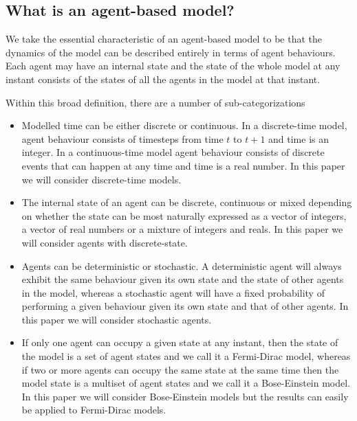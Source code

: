 \documentclass{article}
\begin{document}
\subsection{What is an agent-based model?}

We take the essential characteristic of an agent-based model to be that the dynamics of the model can be described entirely in terms of agent behaviours. Each agent may have an internal state and the state of the whole model at any instant consists of the states of all the agents in the model at that instant.

Within this broad definition, there are a number of sub-categorizations
\begin{itemize}

\item Modelled time can be either discrete or continuous. In a discrete-time model, agent behaviour consists of timesteps from time $t$ to $t+1$ and time is an integer. In a continuous-time model agent behaviour consists of discrete events that can happen at any time and time is a real number. In this paper we will consider discrete-time models.

\item The internal state of an agent can be discrete, continuous or mixed depending on whether the state can be most naturally expressed as a vector of integers, a vector of real numbers or a mixture of integers and reals. In this paper we will consider agents with discrete-state. 

\item Agents can be deterministic or stochastic. A deterministic agent will always exhibit the same behaviour given its own state and the state of other agents in the model, whereas a stochastic agent will have a fixed probability of performing a given behaviour given its own state and that of other agents. In this paper we will consider stochastic agents.

\item If only one agent can occupy a given state at any instant, then the state of the model is a set of agent states and we call it a Fermi-Dirac model, whereas if two or more agents can occupy the same state at the same time then the model state is a multiset\cite{blizard1988multiset} of agent states and we call it a Bose-Einstein model. In this paper we will consider Bose-Einstein models but the results can easily be applied to Fermi-Dirac models.

\end{itemize}
\end{document}

